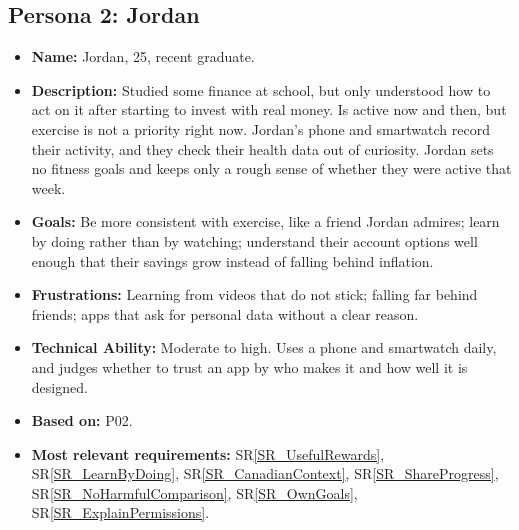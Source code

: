 \documentclass[12pt]{article}
\newcommand{\srref}[1]{SR\ref{#1}}
\begin{document}
\subsection{Persona 2: Jordan}
\begin{itemize}
  \item \textbf{Name:} Jordan, 25, recent graduate.
  \item \textbf{Description:} Studied some finance at school, but only
        understood how to act on it after starting to invest with real money.
        Is active now and then, but exercise is not a priority right now.
        Jordan's phone and smartwatch record their activity, and they check
        their health data out of curiosity. Jordan sets no fitness goals and
        keeps only a rough sense of whether they were active that week.
  \item \textbf{Goals:} Be more consistent with exercise, like a friend Jordan
        admires; learn by doing rather than by watching; understand their account
        options well enough that their savings grow instead of falling behind
        inflation.
  \item \textbf{Frustrations:} Learning from videos that do not stick;
        falling far behind friends; apps that ask for personal data without a clear
        reason.
  \item \textbf{Technical Ability:} Moderate to high. Uses a phone and smartwatch
        daily, and judges whether to trust an app by who makes it and how well it is
        designed.
  \item \textbf{Based on:} P02.
  \item \textbf{Most relevant requirements:} \srref{SR_UsefulRewards},
        \srref{SR_LearnByDoing}, \srref{SR_CanadianContext},
        \srref{SR_ShareProgress}, \srref{SR_NoHarmfulComparison},
        \srref{SR_OwnGoals}, \srref{SR_ExplainPermissions}.
\end{itemize}
\end{document}
